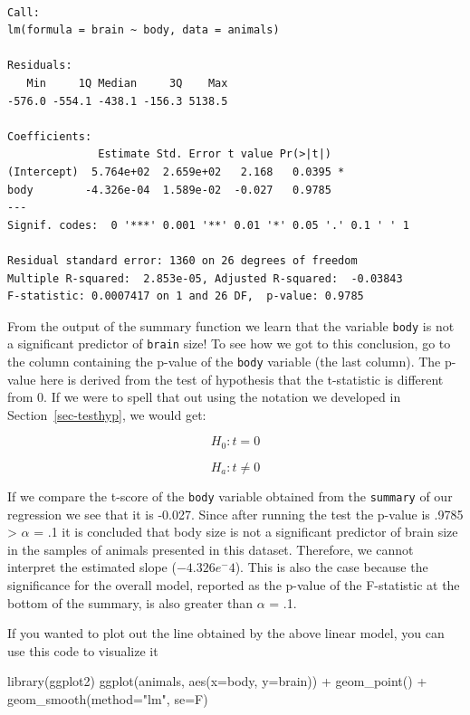 \documentclass[
  letterpaper,
  DIV=11,
  numbers=noendperiod]{scrartcl}
\newenvironment{Shaded}{\begin{snugshade}}{\end{snugshade}}
\newcommand{\AttributeTok}[1]{\textcolor[rgb]{0.40,0.45,0.13}{#1}}
\newcommand{\FunctionTok}[1]{\textcolor[rgb]{0.28,0.35,0.67}{#1}}
\newcommand{\NormalTok}[1]{\textcolor[rgb]{0.00,0.23,0.31}{#1}}
\newcommand{\SpecialCharTok}[1]{\textcolor[rgb]{0.37,0.37,0.37}{#1}}
\newcommand{\StringTok}[1]{\textcolor[rgb]{0.13,0.47,0.30}{#1}}
\newcommand*\circled[1]{\tikz[baseline=(char.base)]{
          \node[shape=circle,draw,inner sep=1pt] (char) {{\scriptsize#1}};}}
\begin{document}
\begin{verbatim}

Call:
lm(formula = brain ~ body, data = animals)

Residuals:
   Min     1Q Median     3Q    Max 
-576.0 -554.1 -438.1 -156.3 5138.5 

Coefficients:
              Estimate Std. Error t value Pr(>|t|)  
(Intercept)  5.764e+02  2.659e+02   2.168   0.0395 *
body        -4.326e-04  1.589e-02  -0.027   0.9785  
---
Signif. codes:  0 '***' 0.001 '**' 0.01 '*' 0.05 '.' 0.1 ' ' 1

Residual standard error: 1360 on 26 degrees of freedom
Multiple R-squared:  2.853e-05, Adjusted R-squared:  -0.03843 
F-statistic: 0.0007417 on 1 and 26 DF,  p-value: 0.9785
\end{verbatim}

From the output of the summary function we learn that the variable
\texttt{body} is not a significant predictor of \texttt{brain} size! To
see how we got to this conclusion, go to the column containing the
p-value of the \texttt{body} variable (the last column). The p-value
here is derived from the test of hypothesis that the t-statistic is
different from 0. If we were to spell that out using the notation we
developed in Section~\ref{sec-testhyp}, we would get:

\[
H_0: t = 0
\]

\[
H_a: t \neq 0
\]

If we compare the t-score of the \texttt{body} variable obtained from
the \texttt{summary} of our regression we see that it is -0.027. Since
after running the test the p-value is .9785 \textgreater{} \(\alpha\) =
.1 it is concluded that body size is not a significant predictor of
brain size in the samples of animals presented in this dataset.
Therefore, we cannot interpret the estimated slope (\(-4.326e^-4\)).
This is also the case because the significance for the overall model,
reported as the p-value of the F-statistic at the bottom of the summary,
is also greater than \(\alpha\) = .1.

If you wanted to plot out the line obtained by the above linear model,
you can use this code to visualize it

\label{annotated-cell-26}%
\begin{Shaded}
\begin{Highlighting}[]
\FunctionTok{library}\NormalTok{(ggplot2)}
\FunctionTok{ggplot}\NormalTok{(animals, }\FunctionTok{aes}\NormalTok{(}\AttributeTok{x=}\NormalTok{body, }\AttributeTok{y=}\NormalTok{brain)) }\SpecialCharTok{+} \hspace*{\fill}\NormalTok{\circled{1}}
  \FunctionTok{geom\_point}\NormalTok{() }\SpecialCharTok{+} \hspace*{\fill}\NormalTok{\circled{2}}
  \FunctionTok{geom\_smooth}\NormalTok{(}\AttributeTok{method=}\StringTok{"lm"}\NormalTok{, }\AttributeTok{se=}\NormalTok{F) }\hspace*{\fill}\NormalTok{\circled{3}}
\end{Highlighting}
\end{Shaded}
\end{document}
